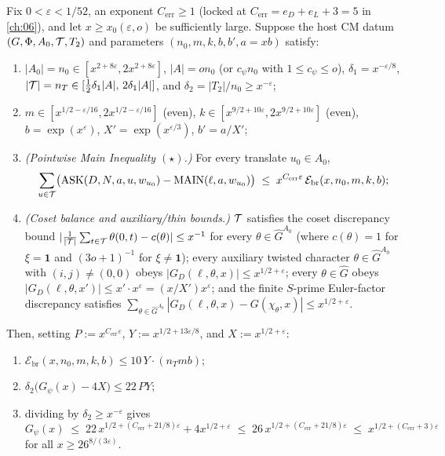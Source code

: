 \begin{proposition}
\label{prop:03:size-bracket}
Fix $0 < \varepsilon < 1/52$, an exponent $C_{\mathrm{err}} \ge 1$ (locked at $C_{\mathrm{err}} = e_D + e_L + 3 = 5$ in \cref{ch:06}), and let $x \ge x_0(\varepsilon, o)$ be sufficiently large. Suppose the host CM datum $(G, \Phi, A_0, \mathcal{T}, T_2)$ and parameters $(n_0, m, k, b, b', a = xb)$ satisfy:
\begin{enumerate}[label=\textup{(H\arabic*)}]
\item $|A_0| = n_0 \in [x^{2+8\varepsilon}, 2x^{2+8\varepsilon}]$, $|A| = o n_0$ (or $c_\psi n_0$ with $1 \le c_\psi \le o$), $\delta_1 = x^{-\varepsilon/8}$, $|\mathcal{T}| = n_T \in [\frac{1}{2}\delta_1 |A|,\, 2\delta_1 |A|]$, and $\delta_2 = |T_2|/n_0 \ge x^{-\varepsilon}$;
\item $m \in [x^{1/2-\varepsilon/16}, 2x^{1/2-\varepsilon/16}]$ (even), $k \in [x^{9/2+10\varepsilon}, 2x^{9/2+10\varepsilon}]$ (even), $b = \exp(x^\varepsilon)$, $X' = \exp(x^{\varepsilon/3})$, $b' = a / X'$;
\item \emph{(Pointwise Main Inequality $(\star)$.)} For every translate $u_0 \in A_0$,
  \begin{equation}
  \label{eq:03:star-input}
    \sum_{u \in \mathcal{T}} \bigl(\mathrm{ASK}(D, N, a, u, w_{u_0}) - \mathrm{MAIN}(\ell, a, w_{u_0})\bigr)
    \;\le\; x^{C_{\mathrm{err}}\varepsilon}\,\mathcal{E}_{\mathrm{br}}(x, n_0, m, k, b);
  \end{equation}
\item \emph{(Coset balance and auxiliary/thin bounds.)} $\mathcal{T}$ satisfies the coset discrepancy bound $|\frac{1}{|\mathcal{T}|}\sum_{t\in\mathcal{T}} \theta(0,t) - c(\theta)| \le x^{-1}$ for every $\theta \in \widehat{G}^{A_0}$ (where $c(\theta) = 1$ for $\xi = \mathbf{1}$ and $(3o+1)^{-1}$ for $\xi \neq \mathbf{1}$); every auxiliary twisted character $\theta \in \widehat{G}^{A_0}$ with $(i,j) \neq (0,0)$ obeys $|G_D(\ell, \theta, x)| \le x^{1/2 + \varepsilon}$; every $\theta \in \widehat{G}$ obeys $|G_D(\ell, \theta, x')| \le x' \cdot x^\varepsilon = (x/X') x^\varepsilon$; and the finite $S$-prime Euler-factor discrepancy satisfies $\sum_{\theta \in \widehat{G}^{A_0}} |G_D(\ell, \theta, x) - G(\chi_\theta, x)| \le x^{1/2+\varepsilon}$.
\end{enumerate}
Then, setting $P := x^{C_{\mathrm{err}}\varepsilon}$, $Y := x^{1/2 + 13\varepsilon/8}$, and $X := x^{1/2 + \varepsilon}$:
\begin{enumerate}[label=\textup{(\alph*)}]
\item $\mathcal{E}_{\mathrm{br}}(x, n_0, m, k, b) \le 10\, Y \cdot (n_T m b)$;
\item $\delta_2 \bigl(G_\psi(x) - 4X\bigr) \le 22\, P Y$;
\item dividing by $\delta_2 \ge x^{-\varepsilon}$ gives
  \begin{equation}
  \label{eq:03:core-step3}
    G_\psi(x) \;\le\; 22\, x^{1/2 + (C_{\mathrm{err}} + 21/8)\varepsilon} + 4x^{1/2 + \varepsilon}
    \;\le\; 26\, x^{1/2 + (C_{\mathrm{err}} + 21/8)\varepsilon}
    \;\le\; x^{1/2 + (C_{\mathrm{err}} + 3)\varepsilon}
  \end{equation}
  for all $x \ge 26^{8/(3\varepsilon)}$.
\end{enumerate}
\end{proposition}
